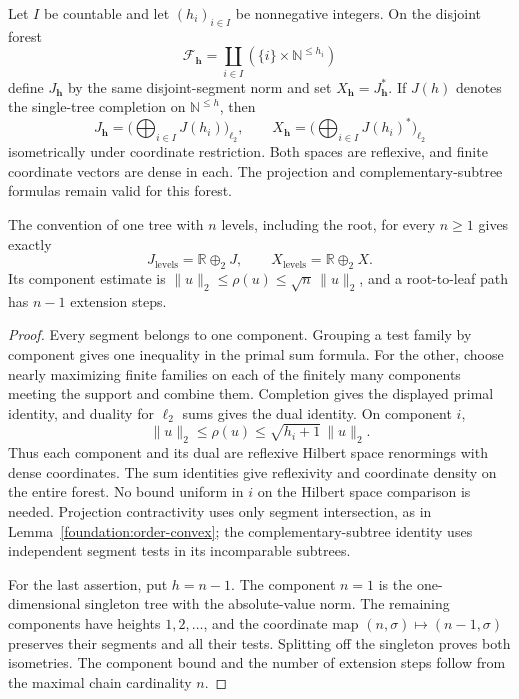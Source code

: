 \begin{proposition}\label{foundation:height-variants}
Let $I$ be countable and let $(h_i)_{i\in I}$ be nonnegative integers.
On the disjoint forest
\[
 \mathcal F_{\boldsymbol h}
   =\coprod_{i\in I}(\{i\}\times\mathbb N^{\le h_i})
\]
define $J_{\boldsymbol h}$ by the same disjoint-segment norm and set
$X_{\boldsymbol h}=J_{\boldsymbol h}^*$. If $J(h)$ denotes the
single-tree completion on $\mathbb N^{\le h}$, then
\[
 J_{\boldsymbol h}
   =\Big(\bigoplus_{i\in I}J(h_i)\Big)_{\ell_2},
 \qquad
 X_{\boldsymbol h}
   =\Big(\bigoplus_{i\in I}J(h_i)^*\Big)_{\ell_2}
\]
isometrically under coordinate restriction. Both spaces are reflexive,
and finite coordinate vectors are dense in each. The projection and
complementary-subtree formulas remain valid for this forest.

The convention of one tree with $n$ levels, including the root, for
every $n\ge1$ gives exactly
\[
 J_{\mathrm{levels}}=\mathbb R\oplus_2 J,
 \qquad X_{\mathrm{levels}}=\mathbb R\oplus_2 X.
\]
Its component estimate is
$\|u\|_2\le\rho(u)\le\sqrt n\,\|u\|_2$, and a root-to-leaf path
has $n-1$ extension steps.
\end{proposition}
\begin{proof}
Every segment belongs to one component. Grouping a test family by
component gives one inequality in the primal sum formula. For the
other, choose nearly maximizing finite families on each of the
finitely many components meeting the support and combine them.
Completion gives the displayed primal identity, and duality for
$\ell_2$ sums gives the dual identity. On component $i$,
\[
 \|u\|_2\le\rho(u)\le\sqrt{h_i+1}\,\|u\|_2.
\]
Thus each component and its dual are reflexive Hilbert space
renormings with dense coordinates. The sum identities give
reflexivity and coordinate density on the entire forest. No bound
uniform in $i$ on the Hilbert space comparison is needed. Projection
contractivity uses only segment intersection, as in
Lemma~\ref{foundation:order-convex}; the complementary-subtree identity
uses independent segment tests in its incomparable subtrees.

For the last assertion, put $h=n-1$. The component $n=1$ is the
one-dimensional singleton tree with the absolute-value norm. The
remaining components have heights $1,2,\ldots$, and the coordinate map
$(n,\sigma)\mapsto(n-1,\sigma)$ preserves their segments and all their
tests. Splitting off the singleton proves both isometries. The
component bound and the number of extension steps follow from the
maximal chain cardinality $n$.
\end{proof}

